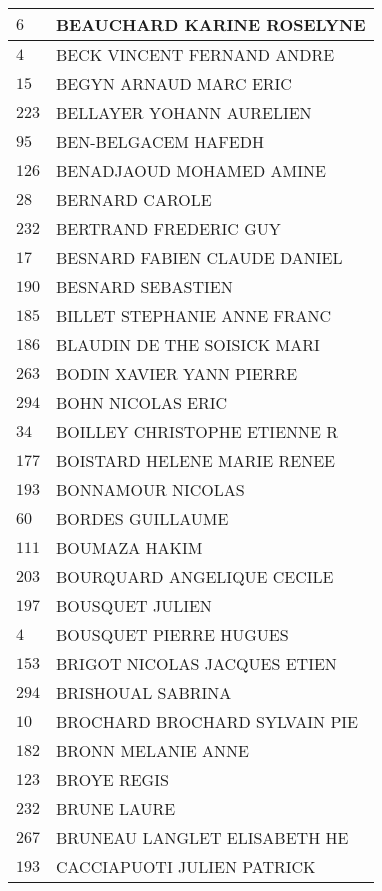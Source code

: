 \begin{xltabular}{\linewidth}{|l|X|}
    \hline
    $6$ & BEAUCHARD KARINE ROSELYNE \\
    \hline
    $4$ & BECK VINCENT FERNAND ANDRE \\
    \hline
    $15$ & BEGYN ARNAUD MARC ERIC \\
    \hline
    $223$ & BELLAYER YOHANN AURELIEN \\
    \hline
    $95$ & BEN-BELGACEM HAFEDH \\
    \hline
    $126$ & BENADJAOUD MOHAMED AMINE \\
    \hline
    $28$ & BERNARD CAROLE \\
    \hline
    $232$ & BERTRAND FREDERIC GUY \\
    \hline
    $17$ & BESNARD FABIEN CLAUDE DANIEL \\
    \hline
    $190$ & BESNARD SEBASTIEN \\
    \hline
    $185$ & BILLET STEPHANIE ANNE FRANC \\
    \hline
    $186$ & BLAUDIN DE THE SOISICK MARI \\
    \hline
    $263$ & BODIN XAVIER YANN PIERRE \\
    \hline
    $294$ & BOHN NICOLAS ERIC \\
    \hline
    $34$ & BOILLEY CHRISTOPHE ETIENNE R \\
    \hline
    $177$ & BOISTARD HELENE MARIE RENEE \\
    \hline
    $193$ & BONNAMOUR NICOLAS \\
    \hline
    $60$ & BORDES GUILLAUME \\
    \hline
    $111$ & BOUMAZA HAKIM \\
    \hline
    $203$ & BOURQUARD ANGELIQUE CECILE \\
    \hline
    $197$ & BOUSQUET JULIEN \\
    \hline
    $4$ & BOUSQUET PIERRE HUGUES \\
    \hline
    $153$ & BRIGOT NICOLAS JACQUES ETIEN \\
    \hline
    $294$ & BRISHOUAL SABRINA \\
    \hline
    $10$ & BROCHARD BROCHARD SYLVAIN PIE \\
    \hline
    $182$ & BRONN MELANIE ANNE \\
    \hline
    $123$ & BROYE REGIS \\
    \hline
    $232$ & BRUNE LAURE \\
    \hline
    $267$ & BRUNEAU LANGLET ELISABETH HE \\
    \hline
    $193$ & CACCIAPUOTI JULIEN PATRICK \\

\end{xltabular}
